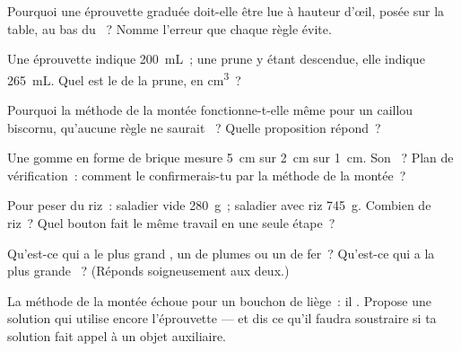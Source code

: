 \begin{exercise}[$\star$]\label{exo:g6:mass-and-volume:3}
Pourquoi une éprouvette graduée doit-elle être lue à hauteur d'œil,
posée sur la table, au bas du ~? Nomme l'erreur que chaque
règle évite.
\end{exercise}

\begin{exercise}[$\star$]\label{exo:g6:mass-and-volume:4}
Une éprouvette indique \qty{200}{mL}~; une prune y étant descendue,
elle indique \qty{265}{mL}. Quel est le  de la prune, en
\unit{cm^3}~?
\end{exercise}

\begin{exercise}[$\star$]\label{exo:g6:mass-and-volume:5}
Pourquoi la méthode de la montée fonctionne-t-elle même pour un
caillou biscornu, qu'aucune règle ne saurait ~? Quelle
proposition répond~?
\end{exercise}

\begin{exercise}[$\star$]\label{exo:g6:mass-and-volume:6}
Une gomme en forme de brique mesure \qty{5}{cm} sur \qty{2}{cm} sur
\qty{1}{cm}. Son ~? Plan de vérification~: comment le
confirmerais-tu par la méthode de la montée~?
\end{exercise}

\begin{exercise}[$\star$]\label{exo:g6:mass-and-volume:7}
Pour peser du riz~: saladier vide \qty{280}{g}~; saladier avec riz
\qty{745}{g}. Combien de riz~? Quel bouton fait le même travail en
une seule étape~?
\end{exercise}

\begin{exercise}[$\star$]\label{exo:g6:mass-and-volume:8}
Qu'est-ce qui a le plus grand , un  de plumes ou un
 de fer~? Qu'est-ce qui a la plus grande ~? (Réponds
soigneusement aux deux.)
\end{exercise}

\begin{exercise}[$\star\star$]\label{exo:g6:mass-and-volume:9}
La méthode de la montée échoue pour un bouchon de liège~: il .
Propose une solution qui utilise encore l'éprouvette --- et dis ce
qu'il faudra soustraire si ta solution fait appel à un objet
auxiliaire.
\end{exercise}


